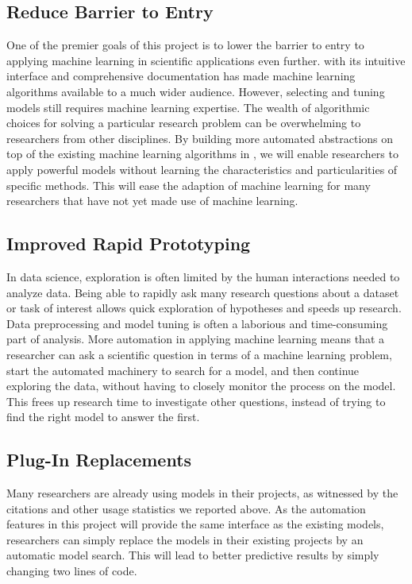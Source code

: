 \subsection{Reduce Barrier to Entry}
One of the premier goals of this project is to lower the barrier to entry
to applying machine learning in scientific applications even further.
\sklearn{} with its intuitive interface and comprehensive documentation
has made machine learning algorithms available to a much wider audience.
However, selecting and tuning models still requires machine learning expertise.
The wealth of algorithmic choices for solving a particular research problem can be
overwhelming to researchers from other disciplines. By building more automated
abstractions on top of the existing machine learning algorithms in \sklearn{},
we will enable researchers to apply powerful models without learning
the characteristics and particularities of specific methods.
This will ease the adaption of machine learning for many researchers
that have not yet made use of machine learning.

\subsection{Improved Rapid Prototyping}
In data science, exploration is often limited by the human interactions needed to analyze data.
Being able to rapidly ask many research questions about a dataset or task of interest allows
quick exploration of hypotheses and speeds up research.
Data preprocessing and model tuning is often a laborious and time-consuming part of analysis.
More automation in applying machine learning means that a researcher can ask a scientific
question in terms of a machine learning problem, start the automated machinery to
search for a model, and then continue exploring the data, without having to closely monitor
the process on the model. 
This frees up research time to investigate other questions, instead of trying to
find the right model to answer the first.

\subsection{Plug-In Replacements}
Many researchers are already using \sklearn{} models in their projects, as witnessed
by the citations and other usage statistics we reported above. As the automation features
in this project will provide the same interface as the existing models, researchers
can simply replace the models in their existing projects by an automatic model search.
This will lead to better predictive results by simply changing two lines of code.


